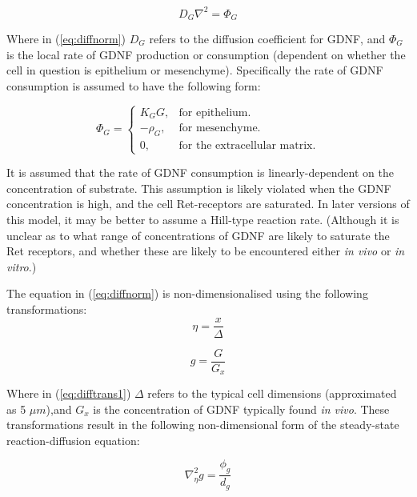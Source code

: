 \documentclass[pdftex,10pt,a4paper]{article}
\begin{document}
\begin{equation}\label{eq:diffnorm}
D_G \nabla^2 = \Phi_G
\end{equation}

Where in (\ref{eq:diffnorm}) $D_G$ refers to the diffusion coefficient for GDNF, and $\Phi_G$ is the local rate of GDNF production or consumption (dependent on whether the cell in question is epithelium or mesenchyme). Specifically the rate of GDNF consumption is assumed to have the following form:

\begin{equation} \label{eq:production}
\Phi_G =\begin{cases}
K_G G, & \text{for epithelium}.\\
-\rho_G, & \text{for mesenchyme}.\\
0, & \text{for the extracellular matrix}.
\end{cases}
\end{equation}

It is assumed that the rate of GDNF consumption is linearly-dependent on the concentration of substrate. This assumption is likely violated when the GDNF concentration is high, and the cell Ret-receptors are saturated. In  later versions of this model, it may be better to assume a Hill-type reaction rate. (Although it is unclear as to what range of concentrations of GDNF are likely to saturate the Ret receptors, and whether these are likely to be encountered either \textit{in vivo} or \textit{in vitro}.)

The equation in (\ref{eq:diffnorm}) is non-dimensionalised using the following transformations:
\begin{equation}\label{eq:difftrans1}
\eta = \frac{x}{\Delta}
\end{equation}

\begin{equation}\label{eq:difftrans2}
g = \frac{G}{G_x}
\end{equation}

Where in (\ref{eq:difftrans1}) $\Delta$ refers to the typical cell dimensions (approximated as 5 $\mu m$),and $G_x$ is the concentration of GDNF typically found \textit{in vivo}. These transformations result in the following non-dimensional form of the steady-state reaction-diffusion equation:

\begin{equation}\label{eq:diff-dimensionless}
\nabla_\eta^2 g = \frac{\phi_g}{d_g}
\end{equation}
\end{document}
